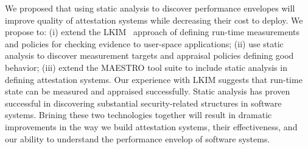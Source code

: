 \documentclass[runningheads]{llncs}
\begin{document}
We proposed that using static analysis to discover performance envelopes will
improve quality of attestation systems while decreasing their cost to deploy. We
propose to: (i) extend the LKIM~\citep{Loscocco:07:Linux-kernel-in} approach of
defining run-time measurements and policies for checking evidence to user-space
applications; (ii) use static analysis to discover measurement targets and
appraisal policies defining good behavior; (iii) extend the MAESTRO tool suite
to include static analysis in defining attestation systems. Our experience with
LKIM suggests that run-time state can be measured and appraised successfully.
Static analysis has proven successful in discovering substantial
security-related structures in software systems.  Brining these two technologies
together will result in dramatic improvements in the way we build attestation
systems, their effectiveness, and our ability to understand the performance
envelop of software systems.

% 
% 
%
%
%


%
\end{document}

